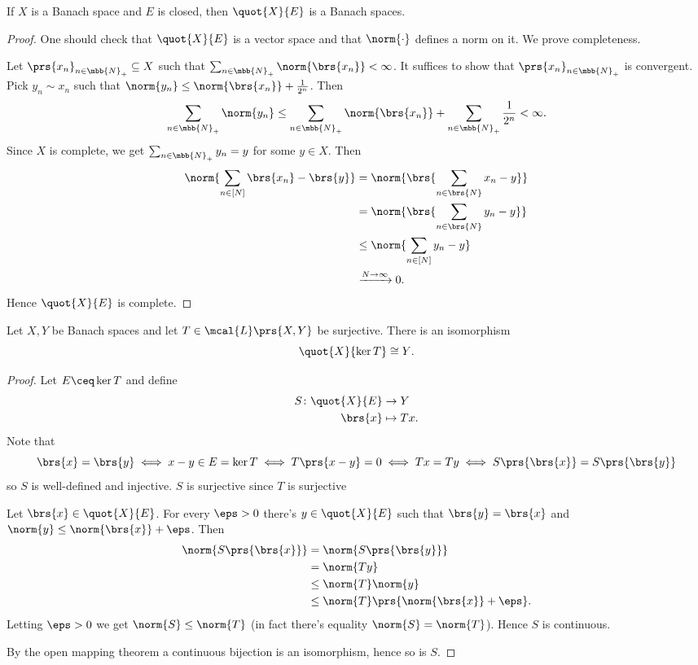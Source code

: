 \documentclass[10pt, twoside]{book}
\begin{document}
\begin{fact}
If $X$ is a Banach space and $E$ is closed, then $\quot{X}{E}$ is a Banach spaces.
\end{fact}

\begin{proof}
One should check that $\quot{X}{E}$ is a vector space and that $\norm{\cdot}$ defines a norm on it. We prove completeness.

Let $\prs{x_n}_{n \in \mbb{N}_+} \subseteq X$ such that $\sum_{n \in \mbb{N}_+} \norm{\brs{x_n}} < \infty$. It suffices to show that $\prs{x_n}_{n \in \mbb{N}_+}$ is convergent. Pick $y_n \sim x_n$ such that $\norm{y_n} \leq \norm{\brs{x_n}} + \frac{1}{2^n}$.
Then
\[\sum_{n \in \mbb{N}_+} \norm{y_n} \leq \sum_{n \in \mbb{N}_+} \norm{\brs{x_n}} + \sum_{n \in \mbb{N}_+} \frac{1}{2^n} < \infty \text{.}\]
Since $X$ is complete, we get $\sum_{n \in \mbb{N}_+} y_n = y$ for some $y \in X$. Then
\begin{align*}
\norm{\sum_{n \in [N]} \brs{x_n} - \brs{y}} &= \norm{\brs{\sum_{n \in \brs{N}} x_n - y}}
\\&= \norm{\brs{\sum_{n \in \brs{N}} y_n - y}}
\\&\leq \norm{\sum_{n \in [N]} y_n - y}
\\&\xrightarrow{N\to\infty} 0 \text{.}
\end{align*}
Hence $\quot{X}{E}$ is complete.
\end{proof}

\begin{theorem}\label{theorem:isomorphism_theorem}
Let $X,Y$ be Banach spaces and let $T \in \mcal{L}\prs{X,Y}$ be surjective. There is an isomorphism
\[\quot{X}{\ker T} \cong Y \text{.}\]
\end{theorem}

\begin{proof}
Let $E \ceq \ker T$ and define
\begin{align*}
S \colon \quot{X}{E} &\to Y \\
\brs{x} &\mapsto Tx \text{.}
\end{align*}
Note that
\[\brs{x} = \brs{y} \iff x-y \in E = \ker T \iff T\prs{x-y} = 0 \iff Tx = Ty \iff S\prs{\brs{x}} = S\prs{\brs{y}}\]
so $S$ is well-defined and injective.
$S$ is surjective since $T$ is surjective

Let $\brs{x} \in \quot{X}{E}$. For every $\eps > 0$ there's $y \in \quot{X}{E}$ such that $\brs{y} =\brs{x}$ and $\norm{y} \leq \norm{\brs{x}} + \eps$.
Then
\begin{align*}
\norm{S\prs{\brs{x}}} &= \norm{S\prs{\brs{y}}}
\\&= \norm{Ty}
\\&\leq \norm{T}\norm{y}
\\&\leq \norm{T} \prs{\norm{\brs{x}}+\eps} \text{.}
\end{align*}
Letting $\eps > 0$ we get $\norm{S} \leq \norm{T}$ (in fact there's equality $\norm{S} = \norm{T}$).
Hence $S$ is continuous.

By the open mapping theorem a continuous bijection is an isomorphism, hence so is $S$.
\end{proof}
\end{document}
